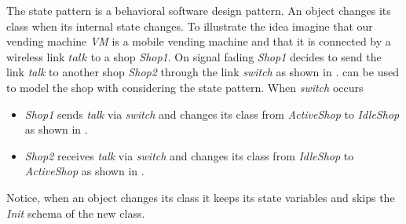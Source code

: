 The state pattern is a behavioral software design pattern. An object changes its class when its internal state changes. To illustrate the idea imagine that our vending machine \textit{VM} is a mobile vending machine and that it is connected by a wireless link $talk$ to a shop \textit{Shop1}. On signal fading \textit{Shop1} decides to send the link \textit{talk} to another shop \textit{Shop2} through the link \textit{switch} as shown in . \oz{} can be used to model the shop with considering the state pattern. When \textit{switch} occurs
\begin{itemize}
\item \textit{Shop1} sends \textit{talk} via \textit{switch} and changes its class from \textit{ActiveShop} to \textit{IdleShop} as shown in .
\item \textit{Shop2} receives \textit{talk} via  \textit{switch} and changes its class from \textit{IdleShop} to \textit{ActiveShop} as shown in .
\end{itemize}
Notice, when an object changes its class it keeps its state variables and skips the \textit{Init} schema of the new class.



